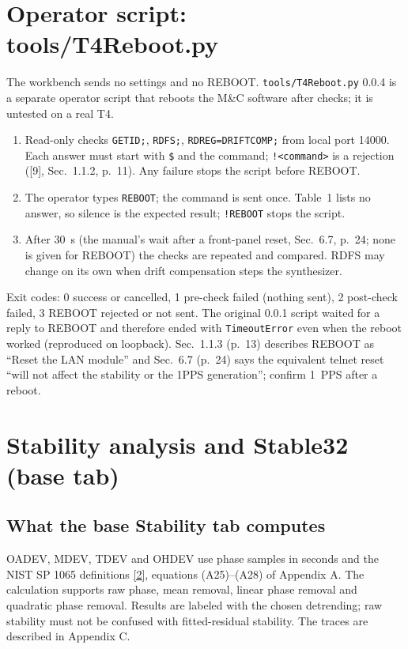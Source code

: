\documentclass[11pt,a4paper]{article}
\newcommand{\nist}{\href{https://tf.nist.gov/general/pdf/2220.pdf}{[2]}}
\newcommand{\tfournet}{[9]}
\renewcommand{\_}{\usscore\allowbreak}
\begin{document}
\section{Operator script: tools/T4\_Reboot.py}
The workbench sends no settings and no REBOOT. \texttt{tools/T4\_Reboot.py} 0.0.4 is a separate
operator script that reboots the M\&C software after checks; it is untested on a real T4.
\begin{enumerate}[leftmargin=6mm]
\item Read-only checks \texttt{GETID;}, \texttt{RDFS;}, \texttt{RDREG=DRIFTCOMP;} from local port
14000. Each answer must start with \texttt{\$} and the command; \texttt{!<command>} is a rejection
(\tfournet, Sec.~1.1.2, p.~11). Any failure stops the script before REBOOT.
\item The operator types \texttt{REBOOT}; the command is sent once. Table~1 lists no answer, so
silence is the expected result; \texttt{!REBOOT} stops the script.
\item After 30~s (the manual's wait after a front-panel reset, Sec.~6.7, p.~24; none is given for
REBOOT) the checks are repeated and compared. RDFS may change on its own when drift compensation
steps the synthesizer.
\end{enumerate}
Exit codes: 0 success or cancelled, 1 pre-check failed (nothing sent), 2 post-check failed,
3 REBOOT rejected or not sent. The original 0.0.1 script waited for a reply to REBOOT and therefore
ended with \texttt{TimeoutError} even when the reboot worked (reproduced on loopback). Sec.~1.1.3
(p.~13) describes REBOOT as ``Reset the LAN module'' and Sec.~6.7 (p.~24) says the equivalent
telnet reset ``will not affect the stability or the 1PPS generation''; confirm 1~PPS after a reboot.
\clearpage
\section{Stability analysis and Stable32 (base tab)}\label{sec:stability}
\subsection{What the base Stability tab computes}
OADEV, MDEV, TDEV and OHDEV use phase samples in seconds and the NIST SP 1065
definitions \nist, equations (A25)--(A28) of Appendix A. The calculation supports raw phase, mean
removal, linear phase removal and quadratic phase removal. Results are labeled with the chosen
detrending; raw stability must not be confused with fitted-residual stability. The traces are
described in Appendix C.
\end{document}
